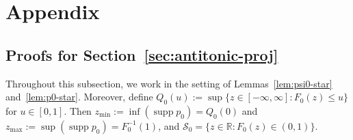 \documentclass[a4paper]{article}
\newcommand{\R}{\mathbb{R}}
\DeclareMathOperator{\supp}{supp}
\theoremstyle{definition}
\begin{document}




\section{Appendix}
\label{sec:appendix}

\subsection{Proofs for Section~\ref{sec:antitonic-proj}}
\label{sec:antitonic-proj-proofs}

Throughout this subsection, we work in the setting of Lemmas~\ref{lem:psi0-star} and~\ref{lem:p0-star}. Moreover, define $Q_0(u) := \sup\{z \in [-\infty,\infty] : F_0(z) \leq u\}$ for $u \in [0,1]$. 
Then $z_{\min} := \inf(\supp p_0) = Q_0(0)$ and $z_{\max} := \sup(\supp p_0) = F_0^{-1}(1)$, and $\mathcal{S}_0 = \{z \in \R : F_0(z) \in (0,1)\}$.
\end{document}
